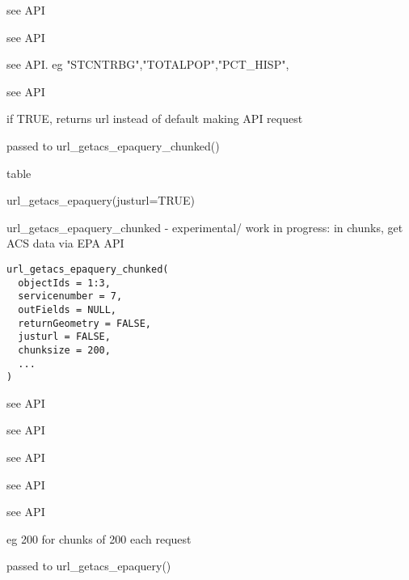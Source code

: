 \documentclass[a4paper]{book}
\begin{document}
%
\begin{Arguments}
\begin{ldescription}
\item[\code{objectIds}] see API

\item[\code{servicenumber}] see API

\item[\code{outFields}] see API. eg "STCNTRBG","TOTALPOP","PCT\_HISP",

\item[\code{returnGeometry}] see API

\item[\code{justurl}] if TRUE, returns url instead of default making API request

\item[\code{...}] passed to url\_getacs\_epaquery\_chunked()
\end{ldescription}
\end{Arguments}
%
\begin{Value}
table
\end{Value}
%
\begin{Examples}
\begin{ExampleCode}
 url_getacs_epaquery(justurl=TRUE) 
\end{ExampleCode}
\end{Examples}
%
\begin{Description}\relax
url\_getacs\_epaquery\_chunked - experimental/ work in progress: in chunks, get ACS data via EPA API
\end{Description}
%
\begin{Usage}
\begin{verbatim}
url_getacs_epaquery_chunked(
  objectIds = 1:3,
  servicenumber = 7,
  outFields = NULL,
  returnGeometry = FALSE,
  justurl = FALSE,
  chunksize = 200,
  ...
)
\end{verbatim}
\end{Usage}
%
\begin{Arguments}
\begin{ldescription}
\item[\code{objectIds}] see API

\item[\code{servicenumber}] see API

\item[\code{outFields}] see API

\item[\code{returnGeometry}] see API

\item[\code{justurl}] see API

\item[\code{chunksize}] eg 200 for chunks of 200 each request

\item[\code{...}] passed to url\_getacs\_epaquery()
\end{ldescription}
\end{Arguments}
\end{document}
